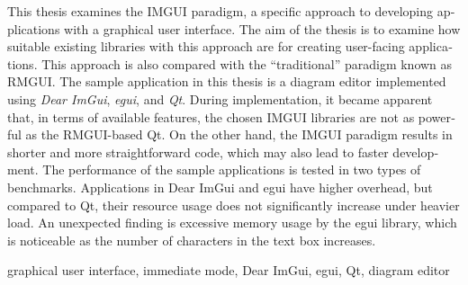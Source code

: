 \documentclass[FM,DP]{tulthesis}
\begin{document}
	\begin{abstractEN}		
		\begin{english}
			This thesis examines the IMGUI paradigm, a specific approach to developing applications with a graphical user interface. The aim of the thesis is to examine how suitable existing libraries with this approach are for creating user-facing applications. This approach is also compared with the ``traditional'' paradigm known as RMGUI. The sample application in this thesis is a diagram editor implemented using \textit{Dear ImGui}, \textit{egui}, and \textit{Qt}. During implementation, it became apparent that, in terms of available features, the chosen IMGUI libraries are not as powerful as the RMGUI-based Qt. On the other hand, the IMGUI paradigm results in shorter and more straightforward code, which may also lead to faster development. The performance of the sample applications is tested in two types of benchmarks. Applications in Dear ImGui and egui have higher overhead, but compared to Qt, their resource usage does not significantly increase under heavier load. An unexpected finding is excessive memory usage by the egui library, which is noticeable as the number of characters in the text box increases.
		\end{english}
	\end{abstractEN}
	
	\begin{keywordsEN}
		\begin{english}graphical user interface, immediate mode, Dear ImGui, egui, Qt, diagram editor\end{english}
	\end{keywordsEN}
	
	\tableofcontents
	
	\listoffigures
	
	{\let\clearpage\relax \listoftables}
	
	{\let\clearpage\relax \listofcodes}
	
	\clearpage
	
	
	\newenvironment{abbrList2}{\phantomsection
		{\section*{Seznam zkratek}\addcontentsline{toc}{section}{Seznam zkratek}}
		\renewcommand{\arraystretch}{1.309}
		\noindent\tabularx{\linewidth}{@{}lX@{}}}
	{\endtabularx
		\clearpage}
	
\end{document}
